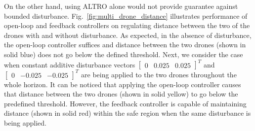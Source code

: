 

On the other hand, using ALTRO alone would not provide guarantee against bounded disturbance.  %
Fig.~\ref{fig:multi_drone_distance} illustrates performance of open-loop and feedback controllers on regulating distance between the two of 
the drones with and without disturbance. 
As expected, in the absence of disturbance, the open-loop controller suffices and distance between the two drones (shown in solid blue) 
does not go below the defined threshold. 
Next, we consider the case when constant additive disturbance vectors $\begin{bmatrix}0 &0.025&0.025\end{bmatrix}^T$ 
and $\begin{bmatrix}0 &-0.025&-0.025\end{bmatrix}^T$ are being applied to the two drones throughout the whole horizon. 
It can be noticed that applying the open-loop controller causes that distance between the two drones (shown in solid yellow) to 
go below the predefined threshold. 
However, the feedback controller is capable of maintaining distance (shown in solid red) within the safe region when the same disturbance is being applied.


